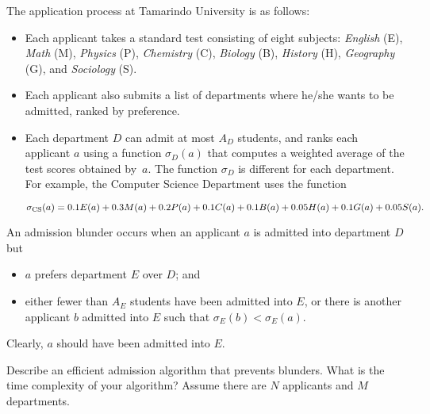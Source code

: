 The application process at Tamarindo University is as follows:

\begin{itemize}

	\item  Each applicant takes a standard test consisting of eight
	subjects: {\em English} (E), {\em Math}
	(M), {\em Physics} (P), {\em Chemistry} (C), {\em Biology} (B),
	{\em History} (H), {\em Geography} (G), and {\em Sociology}
	(S).

	\item  Each applicant also submits a list of departments where
	he/she wants to be admitted, ranked by preference.

	\item  Each department $D$ can admit at most $A_D$ students, and
	ranks each applicant $a$ using a function $\sigma_D(a)$  that
	computes a weighted average of the test scores obtained
	by~$a$.  The function $\sigma_D$  is different for each
	department.  For example, the Computer Science Department uses
	the function

	\[
	\sigma_{\rm CS}(a) = 0.1 E(a) + 0.3 M(a) + 0.2P(a) + 0.1 C(a) +
	0.1 B(a) + 0.05 H(a) + 0.1 G(a) + 0.05 S(a) .
	\]

\end{itemize}

An admission blunder occurs when an applicant $a$ is admitted into
department $D$ but
%
\begin{itemize}

\item  $a$ prefers department $E$ over $D$; and

\item  either fewer than $A_{E}$ students have been admitted into $E$,
or there is another applicant $b$ admitted into $E$ such that
 $\sigma_{E}(b) < \sigma_{E}(a)$.

\end{itemize}
%
Clearly, $a$ should have been admitted into $E$.

\medskip

Describe an efficient admission algorithm that prevents blunders.  What
is the time complexity of your algorithm?  Assume there are $N$
applicants and $M$ departments.
